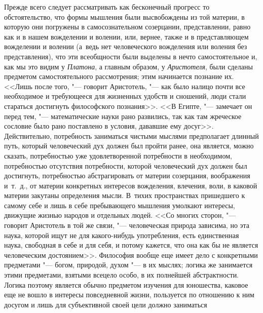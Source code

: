 Прежде всего следует рассматривать как бесконечный прогресс то обстоятельство,
что формы мышления были высвобождены из той материи, в которую они погружены в
самосознательном созерцании, представлении, равно как и в нашем вожделении и
волении, или, вернее, также и в представляющем вожделении и волении (а~ведь нет
человеческого вожделения или воления без представления), что эти всеобщности
были выделены в нечто самостоятельное и, как мы это видим у {\em Платона}, а
главным образом, у {\em Аристотеля}, были сделаны предметом самостоятельного
рассмотрения; этим начинается познание их. <<Лишь после того, "--- говорит
Аристотель, "--- как было налицо почти все необходимое и требующееся для
жизненных удобств и сношений, люди стали стараться достигнуть философского
познания>>. <<В Египте,
"--- замечает он перед тем, "--- математические науки рано развились, так как
там жреческое сословие было рано поставлено в условия, дававшие ему
досуг>>.
Действительно, потребность заниматься чистыми мыслями предполагает длинный
путь, который человеческий дух должен был пройти ранее, она является, можно
сказать, потребностью уже удовлетворенной потребности в необходимом,
потребностью отсутствия потребности, которой человеческий дух должен был
достигнуть, потребностью абстрагировать от материи созерцания, воображения
и~т.~д., от материи конкретных интересов вожделения, влечения, воли, в каковой
материи закутаны определения мысли. В~тихих пространствах пришедшего к самому
себе и лишь в себе пребывающего мышления умолкают интересы, движущие жизнью
народов и отдельных людей. <<Со многих сторон, "--- говорит Аристотель в той же
связи, "--- человеческая природа зависима, но эта наука, которой ищут не для
какого-нибудь употребления, есть единственная наука, свободная в себе и для
себя, и потому кажется, что она как бы не является человеческим
достоянием>>. Философия вообще еще
имеет дело с конкретными предметами "--- богом, природой, духом "--- в их
мыслях; логика же занимается этими предметами, взятыми всецело особо, в их
полнейшей абстрактности. Логика поэтому является обычно предметом изучения для
юношества, каковое еще не вошло в интересы повседневной жизни, пользуется по
отношению к ним досугом и лишь для субъективной своей цели должно заниматься
